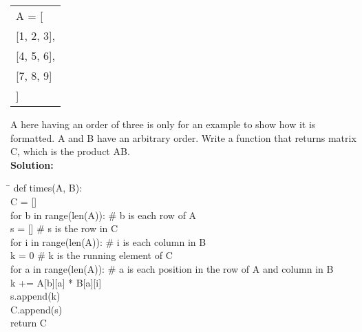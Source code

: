\documentclass{article}
\newcommand{\icode}[1]{{\ttfamily #1}}
\newenvironment{code}{\begin{tcolorbox}\ttfamily}{\end{tcolorbox}}
\begin{document}
\begin{center} \ttfamily
	\begin{tabular}{|l}
		A = [\\
		\phantom{=   }[1, 2, 3],\\
		\phantom{=   }[4, 5, 6],\\
		\phantom{=   }[7, 8, 9]\\
		]
	\end{tabular}
\end{center}
\icode{A} here having an order of three is only for an example to show how it is formatted. \icode{A} and \icode{B} have an arbitrary order. Write a function that returns matrix \icode{C}, which is the product \icode{AB}.\\
\noindent \textbf{Solution:}
\begin{code}
\begin{tabbing}
	\hspace{5 cm} \= \hspace{5 cm} \kill
	def times(A, B):\\
		\hspace{2 em}C = []\\
		\hspace{2 em}for b in range(len(A)):  \# b is each row of A\\
			\hspace{4 em}s = []  \# s is the row in C\\
			\hspace{4 em}for i in range(len(A)):  \# i is each column in B\\
				\hspace{6 em}k = 0  \# k is the running element of C\\
				\hspace{6 em}for a in range(len(A)):  \# a is each position in the row of A and column in B\\
					\hspace{8 em}k += A[b][a] * B[a][i]\\
				\hspace{6 em}s.append(k)\\
			\hspace{4 em}C.append(s)\\
		\hspace{2 em}return C
\end{tabbing}
\end{code}
\end{document}
